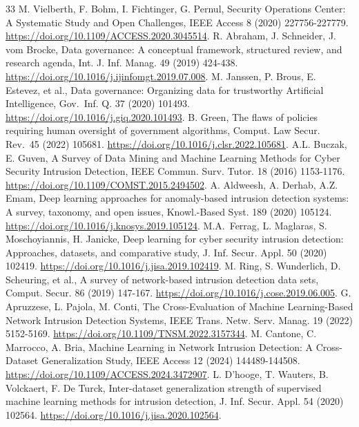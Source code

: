 \documentclass[11pt,letterpaper]{article}
\begin{document}
\begingroup\footnotesize\doublespacing\begin{thebibliography}{33}
M. Vielberth, F. Bohm, I. Fichtinger, G. Pernul, Security Operations Center: A Systematic Study and Open Challenges, IEEE Access 8 (2020) 227756-227779. \url{https://doi.org/10.1109/ACCESS.2020.3045514}.
R. Abraham, J. Schneider, J. vom Brocke, Data governance: A conceptual framework, structured review, and research agenda, Int. J. Inf. Manag. 49 (2019) 424-438. \url{https://doi.org/10.1016/j.ijinfomgt.2019.07.008}.
M. Janssen, P. Brous, E. Estevez, et al., Data governance: Organizing data for trustworthy Artificial Intelligence, Gov.~Inf. Q. 37 (2020) 101493. \url{https://doi.org/10.1016/j.giq.2020.101493}.
B. Green, The flaws of policies requiring human oversight of government algorithms, Comput. Law Secur. Rev.~45 (2022) 105681. \url{https://doi.org/10.1016/j.clsr.2022.105681}.
A.L. Buczak, E. Guven, A Survey of Data Mining and Machine Learning Methods for Cyber Security Intrusion Detection, IEEE Commun. Surv. Tutor. 18 (2016) 1153-1176. \url{https://doi.org/10.1109/COMST.2015.2494502}.
A. Aldweesh, A. Derhab, A.Z. Emam, Deep learning approaches for anomaly-based intrusion detection systems: A survey, taxonomy, and open issues, Knowl.-Based Syst. 189 (2020) 105124. \url{https://doi.org/10.1016/j.knosys.2019.105124}.
M.A.~Ferrag, L. Maglaras, S. Moschoyiannis, H. Janicke, Deep learning for cyber security intrusion detection: Approaches, datasets, and comparative study, J. Inf. Secur. Appl. 50 (2020) 102419. \url{https://doi.org/10.1016/j.jisa.2019.102419}.
M. Ring, S. Wunderlich, D. Scheuring, et al., A survey of network-based intrusion detection data sets, Comput. Secur. 86 (2019) 147-167. \url{https://doi.org/10.1016/j.cose.2019.06.005}.
G. Apruzzese, L. Pajola, M. Conti, The Cross-Evaluation of Machine Learning-Based Network Intrusion Detection Systems, IEEE Trans. Netw. Serv. Manag. 19 (2022) 5152-5169. \url{https://doi.org/10.1109/TNSM.2022.3157344}.
M. Cantone, C. Marrocco, A. Bria, Machine Learning in Network Intrusion Detection: A Cross-Dataset Generalization Study, IEEE Access 12 (2024) 144489-144508. \url{https://doi.org/10.1109/ACCESS.2024.3472907}.
L. D'hooge, T. Wauters, B. Volckaert, F. De Turck, Inter-dataset generalization strength of supervised machine learning methods for intrusion detection, J. Inf. Secur. Appl. 54 (2020) 102564. \url{https://doi.org/10.1016/j.jisa.2020.102564}.

\end{thebibliography}
\end{document}
